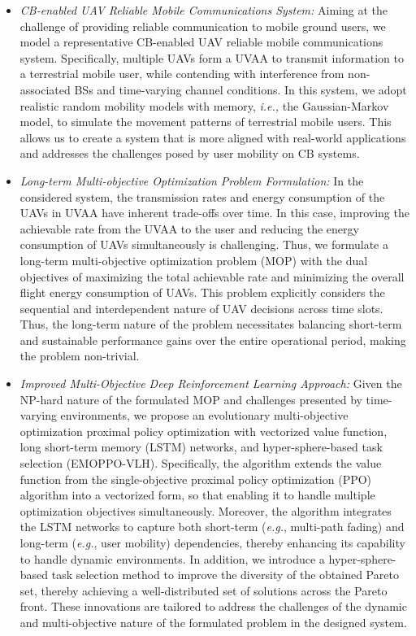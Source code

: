 \documentclass[10pt,journal,compsoc]{IEEEtran}
\begin{document}
\begin{itemize}
    \item \textit{CB-enabled UAV Reliable Mobile Communications System:} Aiming at the challenge of providing reliable communication to mobile ground users, we model a representative CB-enabled UAV reliable mobile communications system. Specifically, multiple UAVs form a UVAA to transmit information to a terrestrial mobile user, while contending with interference from non-associated BSs and time-varying channel conditions. In this system, we adopt realistic random mobility models with memory, \textit{i.e.,} the Gaussian-Markov model, to simulate the movement patterns of terrestrial mobile users. This allows us to create a system that is more aligned with real-world applications and addresses the challenges posed by user mobility on CB systems.
    
    \item \textit{Long-term Multi-objective Optimization Problem Formulation:} In the considered system, the transmission rates and energy consumption of the UAVs in UVAA have inherent trade-offs over time. In this case, improving the achievable rate from the UVAA to the user and reducing the energy consumption of UAVs simultaneously is challenging. Thus, we formulate a long-term multi-objective optimization problem (MOP) with the dual objectives of maximizing the total achievable rate and minimizing the overall flight energy consumption of UAVs. This problem explicitly considers the sequential and interdependent nature of UAV decisions across time slots. Thus, the long-term nature of the problem necessitates balancing short-term and sustainable performance gains over the entire operational period, making the problem non-trivial.
    
    \item \textit{Improved Multi-Objective Deep Reinforcement Learning Approach:} Given the NP-hard nature of the formulated MOP and challenges presented by time-varying environments, we propose an evolutionary multi-objective optimization proximal policy optimization with vectorized value function, long short-term memory (LSTM) networks, and hyper-sphere-based task selection (EMOPPO-VLH). Specifically, the algorithm extends the value function from the single-objective proximal policy optimization (PPO) algorithm into a vectorized form, so that enabling it to handle multiple optimization objectives simultaneously. Moreover, the algorithm integrates the LSTM networks to capture both short-term (\textit{e.g.}, multi-path fading) and long-term (\textit{e.g.}, user mobility) dependencies, thereby enhancing its capability to handle dynamic environments. In addition, we introduce a hyper-sphere-based task selection method to improve the diversity of the obtained Pareto set, thereby achieving a well-distributed set of solutions across the Pareto front. These innovations are tailored to address the challenges of the dynamic and multi-objective nature of the formulated problem in the designed system.
    

\end{itemize}
\end{document}
